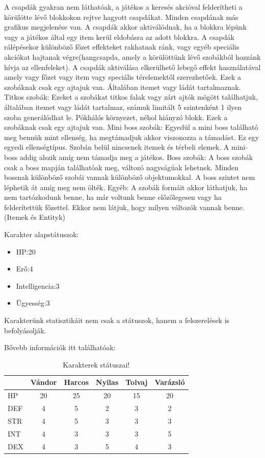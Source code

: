 A csapdák gyakran nem láthatóak, a játékos a keresés akcióval felderítheti a körülötte lévő blokkokon rejtve hagyott csapdákat.
Minden csapdának más grafikus megjelenése van.
A csapdák akkor aktiválódnak, ha a blokkra lépünk vagy a játékos által egy item kerül eldobásra az adott blokkra.
A csapdák rálépésekor különböző főzet effekteket rakhatnak ránk, vagy egyéb speciális akciókat hajtanak végre(hangcsapda, amely a körülöttünk lévő szobákból hozzánk hívja az ellenfeleket).
A csapdák aktiválása elkerülhető lebegő effekt használatával amely vagy főzet vagy item vagy speciális térelemektől szerezhetőek. Ezek a szobáknak csak egy ajtajuk van. Általában itemet vagy ládát tartalmaznak.
Titkos szobák:
Ezeket a szobákat titkos falak vagy zárt ajtók mögött találhatjuk, általában itemet vagy ládát tartalmaz, számuk limitált 5 szintenként 1 ilyen szoba generálódhat le. Pókhálós környezet, néhol hiányzó blokk. Ezek a szobáknak csak egy ajtajuk van.
Mini boss szobák:
Egyedül a mini boss található meg bennük mint ellenség, ha megtámadjuk akkor viszonozza a támadást. Ez egy egyedi ellenségtípus. Szobán belül nincsenek itemek és térbeli elemek.
A mini-boss addig alszik amíg nem támadja meg a játékos.
Boss szobák:
A boss szobák csak a boss mapján találhatóak meg, változó nagyságúak lehetnek.
Minden bossnak különböző szobái vannak különböző objektumokkal.
A boss szintet nem léphetik át amíg meg nem ölték.
Egyéb:
A szobák formáit akkor láthatjuk, ha nem tartózkodunk benne, ha már voltunk benne előzőlegesen vagy ha felderítettük főzettel. Ekkor nem látjuk, hogy milyen változók vannak benne. (Itemek és Entityk)


Karakter alapstátuszok:
\begin{itemize}
    \item HP:20
    \item Erő:4
    \item Intelligencia:3
    \item Ügyesség:3
\end{itemize}


Karakterünk statisztikáit nem csak a státuszok, hanem a felszerelések is befolyásolják.

Bővebb információk itt találhatóak:%
\begin{table}[h]
\centering
\caption{Karakterek státuszai!}
\label{tab:minta}
\begin{tabular}{|l|c|c|c|c|c|}
\hline
 & Vándor & Harcos & Nyilas & Tolvaj & Varázsló \\
\hline
HP & 20 & 25 & 20 & 15 & 20 \\
\hline
DEF & 4 & 5 & 2 & 3 & 2 \\
\hline
STR & 4 & 5 & 3 & 3 & 3 \\
\hline
INT & 4 & 3 & 3 & 3 & 5 \\
\hline
DEX & 4 & 3 & 5 & 4 & 3 \\
\hline
\end{tabular}
\end{table}

